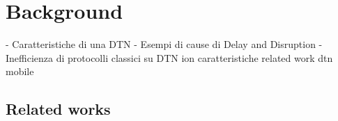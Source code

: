 
\chapter{Background}\label{background} %





- Caratteristiche di una DTN 
   - Esempi di cause di Delay and Disruption
   - Inefficienza di protocolli classici su DTN ion caratteristiche
related work dtn mobile


\section{Related works}

